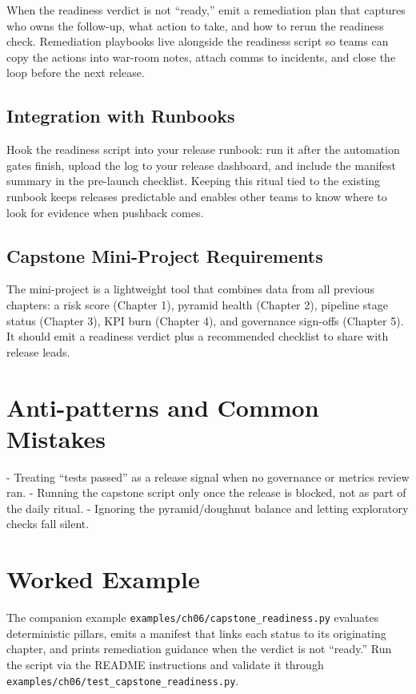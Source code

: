 When the readiness verdict is not “ready,” emit a remediation plan that captures who owns the follow-up, what action to take, and how to rerun the readiness check. Remediation playbooks live alongside the readiness script so teams can copy the actions into war-room notes, attach comms to incidents, and close the loop before the next release.

\subsection{Integration with Runbooks}

Hook the readiness script into your release runbook: run it after the automation gates finish, upload the log to your release dashboard, and include the manifest summary in the pre-launch checklist. Keeping this ritual tied to the existing runbook keeps releases predictable and enables other teams to know where to look for evidence when pushback comes.

\subsection{Capstone Mini-Project Requirements}

The mini-project is a lightweight tool that combines data from all previous chapters: a risk score (Chapter 1), pyramid health (Chapter 2), pipeline stage status (Chapter 3), KPI burn (Chapter 4), and governance sign-offs (Chapter 5). It should emit a readiness verdict plus a recommended checklist to share with release leads.

\section{Anti-patterns and Common Mistakes}

- Treating “tests passed” as a release signal when no governance or metrics review ran.
- Running the capstone script only once the release is blocked, not as part of the daily ritual.
- Ignoring the pyramid/doughnut balance and letting exploratory checks fall silent.

\section{Worked Example}

The companion example \texttt{examples/ch06/capstone\_readiness.py} evaluates deterministic pillars, emits a manifest that links each status to its originating chapter, and prints remediation guidance when the verdict is not “ready.” Run the script via the README instructions and validate it through \texttt{examples/ch06/test\_capstone\_readiness.py}.

